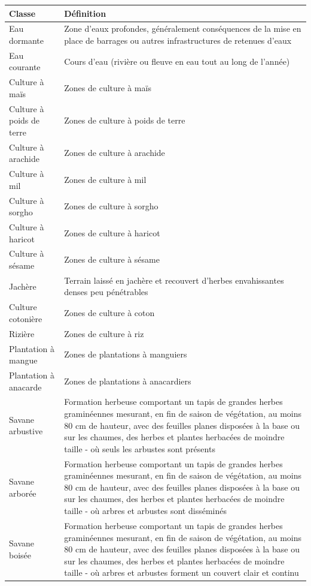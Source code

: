 \documentclass[12pt,twoside]{reedthesis}
\begin{document}
\begingroup\fontsize{7}{9}\selectfont
\begin{tabu} to 
\toprule
Classe & Définition\\
\midrule
{}  Eau dormante & Zone d'eaux profondes, généralement conséquences de la mise en place de barrages ou autres infrastructures de retenues d’eaux\\
Eau courante & Cours d’eau (rivière ou fleuve en eau tout au long de l’année)\\
  Culture à maïs & Zones de culture à maïs\\
Culture à poids de terre & Zones de culture à poids de terre\\
  Culture à arachide & Zones de culture à arachide\\
\addlinespace
Culture à mil & Zones de culture à mil\\
  Culture à sorgho & Zones de culture à sorgho\\
Culture à haricot & Zones de culture à haricot\\
  Culture à sésame & Zones de culture à sésame\\
Jachère & Terrain laissé en jachère et recouvert d’herbes envahissantes denses peu pénétrables\\
\addlinespace
{}  Culture cotonière & Zones de culture à coton\\
Rizière & Zones de culture à riz\\
  Plantation à mangue & Zones de plantations à manguiers\\
Plantation à anacarde & Zones de plantations à anacardiers\\
  Savane arbustive & Formation herbeuse comportant un tapis de grandes herbes graminéennes mesurant, en fin de saison de végétation, au moins 80 cm de hauteur, avec des feuilles planes disposées à la base ou sur les chaumes, des herbes et plantes herbacées de moindre taille - où seuls les arbustes sont présents\\
\addlinespace
Savane arborée & Formation herbeuse comportant un tapis de grandes herbes graminéennes mesurant, en fin de saison de végétation, au moins 80 cm de hauteur, avec des feuilles planes disposées à la base ou sur les chaumes, des herbes et plantes herbacées de moindre taille - où arbres et arbustes sont disséminés\\
  Savane boisée & Formation herbeuse comportant un tapis de grandes herbes graminéennes mesurant, en fin de saison de végétation, au moins 80 cm de hauteur, avec des feuilles planes disposées à la base ou sur les chaumes, des herbes et plantes herbacées de moindre taille - où arbres et arbustes forment un couvert clair et continu\\

\end{tabu}
\end{document}
